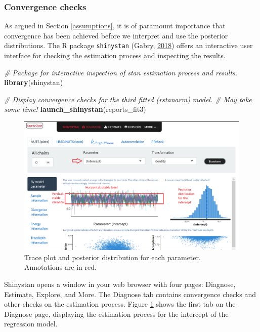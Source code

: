 \documentclass[doc]{apa6}
\newenvironment{Shaded}{\begin{snugshade}}{\end{snugshade}}
\newcommand{\KeywordTok}[1]{\textcolor[rgb]{0.13,0.29,0.53}{\textbf{#1}}}
\newcommand{\CommentTok}[1]{\textcolor[rgb]{0.56,0.35,0.01}{\textit{#1}}}
\newcommand{\NormalTok}[1]{#1}
\begin{document}
\subsubsection{Convergence checks}\label{checks}

As argued in Section \ref{assumptions}, it is of paramount importance
that convergence has been achieved before we interpret and use the
posterior distributions. The R package \texttt{shinystan} (Gabry,
\protect\hyperlink{ref-R-shinystan}{2018}) offers an interactive user
interface for checking the estimation process and inspecting the
results.

\begin{Shaded}
\begin{Highlighting}[]
\CommentTok{# Package for interactive inspection of stan estimation process and results.}
\KeywordTok{library}\NormalTok{(shinystan) }

\CommentTok{# Display convergence checks for the third fitted (rstanarm) model.}
\CommentTok{# May take some time!}
\KeywordTok{launch_shinystan}\NormalTok{(reports_fit3)}
\end{Highlighting}
\end{Shaded}

\begin{figure}[H]
\includegraphics[width=1\linewidth]{shinystan1} \caption{Trace plot and posterior distribution for each parameter. Annotations are in red.}\label{fig:shinystanshot1}
\end{figure}

Shinystan opens a window in your web browser with four pages: Diagnose,
Estimate, Explore, and More. The Diagnose tab contains convergence
checks and other checks on the estimation process. Figure
\ref{fig:shinystanshot1} shows the first tab on the Diagnose page,
displaying the estimation process for the intercept of the regression
model.
\end{document}
